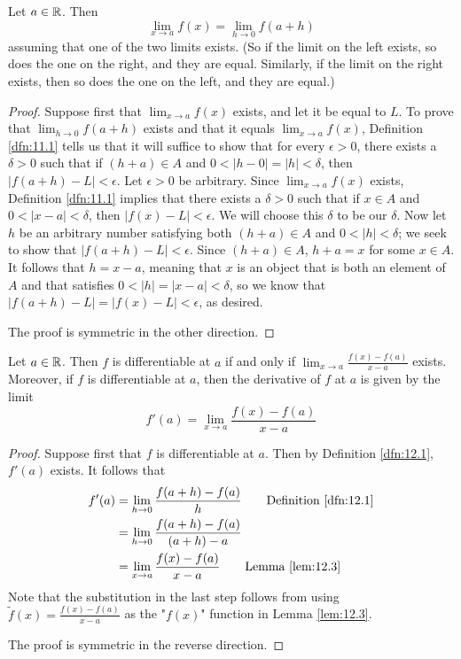 \documentclass[../main.tex]{subfiles}
\begin{document}
\begin{lemma}\label{lem:12.3}
    Let $a\in\mathbb{R}$. Then
    \begin{equation*}
        \lim_{x\to a}f(x) = \lim_{h\to 0}f(a+h)
    \end{equation*}
    assuming that one of the two limits exists. (So if the limit on the left exists, so does the one on the right, and they are equal. Similarly, if the limit on the right exists, then so does the one on the left, and they are equal.)
    \begin{proof}
        Suppose first that $\lim_{x\to a}f(x)$ exists, and let it be equal to $L$. To prove that $\lim_{h\to 0}f(a+h)$ exists and that it equals $\lim_{x\to a}f(x)$, Definition \ref{dfn:11.1} tells us that it will suffice to show that for every $\epsilon>0$, there exists a $\delta>0$ such that if $(h+a)\in A$ and $0<|h-0|=|h|<\delta$, then $|f(a+h)-L|<\epsilon$. Let $\epsilon>0$ be arbitrary. Since $\lim_{x\to a}f(x)$ exists, Definition \ref{dfn:11.1} implies that there exists a $\delta>0$ such that if $x\in A$ and $0<|x-a|<\delta$, then $|f(x)-L|<\epsilon$. We will choose this $\delta$ to be our $\delta$. Now let $h$ be an arbitrary number satisfying both $(h+a)\in A$ and $0<|h|<\delta$; we seek to show that $|f(a+h)-L|<\epsilon$. Since $(h+a)\in A$, $h+a=x$ for some $x\in A$. It follows that $h=x-a$, meaning that $x$ is an object that is both an element of $A$ and that satisfies $0<|h|=|x-a|<\delta$, so we know that $|f(a+h)-L|=|f(x)-L|<\epsilon$, as desired.\par
        The proof is symmetric in the other direction.
    \end{proof}
\end{lemma}

\begin{theorem}\label{trm:12.4}
    Let $a\in\mathbb{R}$. Then $f$ is differentiable at $a$ if and only if $\lim_{x\to a}\frac{f(x)-f(a)}{x-a}$ exists. Moreover, if $f$ is differentiable at $a$, then the derivative of $f$ at $a$ is given by the limit
    \begin{equation*}
        f'(a) = \lim_{x\to a}\frac{f(x)-f(a)}{x-a}
    \end{equation*}
    \begin{proof}
        Suppose first that $f$ is differentiable at $a$. Then by Definition \ref{dfn:12.1}, $f'(a)$ exists. It follows that
        \begin{align*}
            f'(a) &= \lim_{h\to 0}\frac{f(a+h)-f(a)}{h}\tag*{Definition \ref{dfn:12.1}}\\
            &= \lim_{h\to 0}\frac{f(a+h)-f(a)}{(a+h)-a}\\
            &= \lim_{x\to a}\frac{f(x)-f(a)}{x-a}\tag*{Lemma \ref{lem:12.3}}
        \end{align*}
        Note that the substitution in the last step follows from using $\tilde{f}(x)=\frac{f(x)-f(a)}{x-a}$ as the "$f(x)$" function in Lemma \ref{lem:12.3}.\par
        The proof is symmetric in the reverse direction.
    \end{proof}
\end{theorem}
\end{document}
